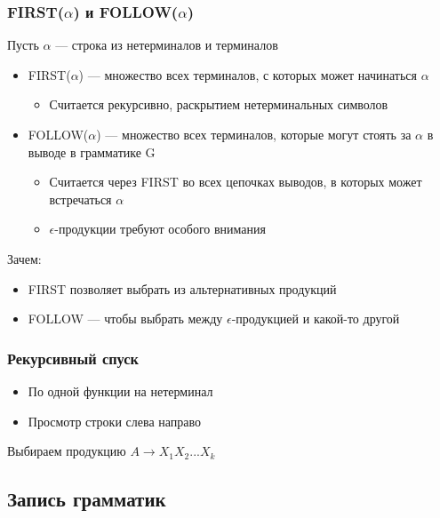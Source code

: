 \documentclass[xetex,mathserif,serif]{beamer}
\begin{document}
	\begin{frame}
		\frametitle{FIRST($\alpha$) и FOLLOW($\alpha$)}
		Пусть $\alpha$ --- строка из нетерминалов и терминалов
		\begin{itemize}
			\item FIRST($\alpha$) --- множество всех терминалов, с которых может начинаться $\alpha$
			\begin{itemize}
				\item Считается рекурсивно, раскрытием нетерминальных символов
			\end{itemize}
			\item FOLLOW($\alpha$) --- множество всех терминалов, которые могут стоять за $\alpha$ в выводе в грамматике G
			\begin{itemize}
				\item Считается через FIRST во всех цепочках выводов, в которых может встречаться $\alpha$
				\item $\epsilon$-продукции требуют особого внимания
			\end{itemize}
		\end{itemize}
		Зачем:
		\begin{itemize}
			\item FIRST позволяет выбрать из альтернативных продукций
			\item FOLLOW --- чтобы выбрать между $\epsilon$-продукцией и какой-то другой
		\end{itemize}
	\end{frame}

	\begin{frame}[fragile]
		\frametitle{Рекурсивный спуск}
		\begin{itemize}
			\item По одной функции на нетерминал
			\item Просмотр строки слева направо
		\end{itemize}

		\begin{algorithm}[H]
			Выбираем продукцию $A \rightarrow X_1X_2...X_k$\;
		\end{algorithm}
	\end{frame}

	\subsection{Запись грамматик}
\end{document}
